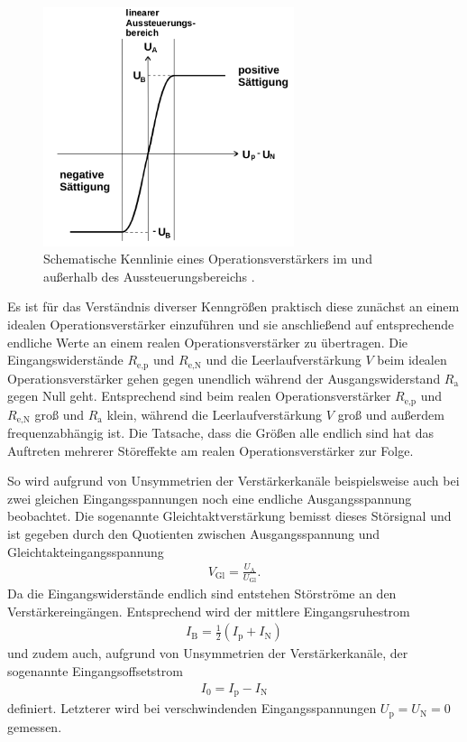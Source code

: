 \begin{figure}
  \centering
  \includegraphics[height=7cm]{ImmerDieseNorweger/kennlinieOPV.png}
  \caption{Schematische Kennlinie eines Operationsverstärkers im und außerhalb des Aussteuerungsbereichs \cite{anleitung}.}
  \label{fig:kennlinieOPV}
\end{figure}

Es ist für das Verständnis diverser Kenngrößen praktisch diese zunächst an einem idealen Operationsverstärker
einzuführen und sie anschließend auf entsprechende endliche Werte an einem
realen Operationsverstärker zu übertragen. Die Eingangswiderstände $R_\text{e,p}$ und $R_\text{e,N}$
und die Leerlaufverstärkung $V$ beim idealen Operationsverstärker gehen gegen unendlich während der
Ausgangswiderstand $R_\text{a}$ gegen Null geht. Entsprechend sind beim realen Operationsverstärker
$R_\text{e,p}$ und $R_\text{e,N}$ groß und $R_\text{a}$ klein, während die Leerlaufverstärkung
$V$ groß und außerdem frequenzabhängig ist. Die Tatsache, dass die Größen alle endlich sind hat das
Auftreten mehrerer Störeffekte am realen Operationsverstärker zur Folge.

So wird aufgrund von Unsymmetrien der Verstärkerkanäle beispielsweise auch bei zwei
gleichen Eingangsspannungen noch eine endliche Ausgangsspannung beobachtet. Die sogenannte Gleichtaktverstärkung
bemisst dieses Störsignal und ist gegeben durch den Quotienten zwischen Ausgangsspannung und
Gleichtakteingangsspannung
\begin{align}
  V_\text{Gl} = \frac{U_\text{A}}{U_\text{Gl}}.
\end{align}
Da die Eingangswiderstände endlich sind entstehen Störströme an den Verstärkereingängen.
Entsprechend wird der mittlere Eingangsruhestrom
\begin{align}
  I_\text{B} = \frac12 \left( I_\text{p} + I_\text{N} \right)
\end{align}
und zudem auch, aufgrund von Unsymmetrien der Verstärkerkanäle, der sogenannte
Eingangsoffsetstrom
\begin{align}
  I_0 = I_\text{p} - I_\text{N}
\end{align}
definiert. Letzterer wird bei verschwindenden Eingangsspannungen $U_\text{p} = U_\text{N} = 0$ gemessen.

